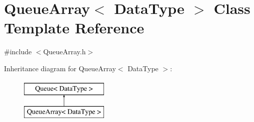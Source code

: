 \hypertarget{class_queue_array}{\section{\-Queue\-Array$<$ \-Data\-Type $>$ \-Class \-Template \-Reference}
\label{class_queue_array}
}


{\ttfamily \#include $<$\-Queue\-Array.\-h$>$}

\-Inheritance diagram for \-Queue\-Array$<$ \-Data\-Type $>$\-:\begin{figure}[H]
\begin{center}
\leavevmode
\includegraphics[height=2.000000cm]{class_queue_array}
\end{center}
\end{figure}

